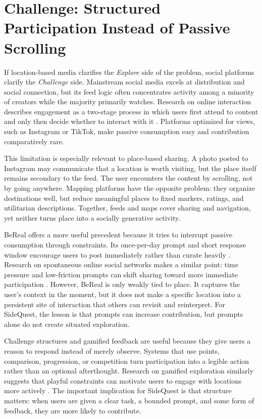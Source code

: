 \documentclass[12pt,a4paper,oneside]{report}
\begin{document}
\section{Challenge: Structured Participation Instead of Passive Scrolling}
If location-based media clarifies the \textit{Explore} side of the problem, social platforms clarify the \textit{Challenge} side. Mainstream social media excels at distribution and social connection, but its feed logic often concentrates activity among a minority of creators while the majority primarily watches. Research on online interaction describes engagement as a two-stage process in which users first attend to content and only then decide whether to interact with it \cite{Viral}. Platforms optimized for views, such as Instagram or TikTok, make passive consumption easy and contribution comparatively rare.

This limitation is especially relevant to place-based sharing. A photo posted to Instagram may communicate that a location is worth visiting, but the place itself remains secondary to the feed. The user encounters the content by scrolling, not by going anywhere. Mapping platforms have the opposite problem: they organize destinations well, but reduce meaningful places to fixed markers, ratings, and utilitarian descriptions. Together, feeds and maps cover sharing and navigation, yet neither turns place into a socially generative activity.

BeReal offers a more useful precedent because it tries to interrupt passive consumption through constraints. Its once-per-day prompt and short response window encourage users to post immediately rather than curate heavily \cite{BeReal}. Research on spontaneous online social networks makes a similar point: time pressure and low-friction prompts can shift sharing toward more immediate participation \cite{BerealTourism}. However, BeReal is only weakly tied to place. It captures the user's context in the moment, but it does not make a specific location into a persistent site of interaction that others can revisit and reinterpret. For SideQuest, the lesson is that prompts can increase contribution, but prompts alone do not create situated exploration.

Challenge structures and gamified feedback are useful because they give users a reason to respond instead of merely observe. Systems that use points, comparison, progression, or competition turn participation into a legible action rather than an optional afterthought. Research on gamified exploration similarly suggests that playful constraints can motivate users to engage with locations more actively \cite{GeoTourism}. The important implication for SideQuest is that structure matters: when users are given a clear task, a bounded prompt, and some form of feedback, they are more likely to contribute.
\end{document}
